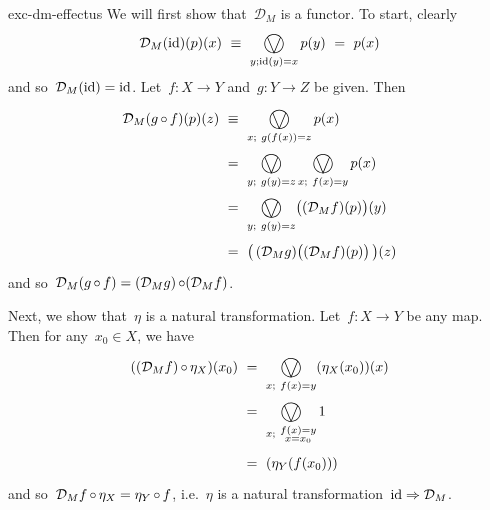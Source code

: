 \begin{solution}{exc-dm-effectus}%
We will first show that~$\mathcal{D}_M$ is a functor.
To start, clearly
\begin{equation*}
    \mathcal{D}_M(\id)(p)(x) 
        \ \equiv\  \bigovee_{y; \id(y)=x} p(y)
        \ =\ p(x)
\end{equation*}
        and so~$\mathcal{D}_M(\mathrm{id}) = \mathrm{id}$.
Let~$f\colon X \to Y$ and~$g\colon Y \to Z$ be given.
    Then
    \begin{align*}
        \mathcal{D}_M (g \after f) (p) (z)
        & \ \equiv\ \bigovee_{x;\ g(f(x))=z} p(x)\\
        & \ =\ \bigovee_{y;\ g(y) = z}
               \bigovee_{x;\ f(x) = y} p(x) \\
        & \ =\ \bigovee_{y;\ g(y) = z}
                \bigl((\mathcal{D}_M f)(p)\bigr)(y) \\
        & \ =\ \bigl( \, (\mathcal{D}_M g) \bigl(
                (\mathcal{D}_M f)(p)\bigr) \, \bigr)(z)
    \end{align*}
    and so~$\mathcal{D}_M (g \mathop{\circ} f)
        = (\mathcal{D}_M g)\mathop{\circ} (\mathcal{D}_M f)$.

Next, we show that~$\eta$ is a natural transformation.
Let~$f\colon X \to Y$ be any map.
Then for any~$x_0 \in X$, we have
\begin{align*}
    ((\mathcal{D}_M f) \after \eta_X) (x_0)
        & \ = \ \bigovee_{x;\ f(x)=y} (\eta_X(x_0))(x) \\
        & \ = \ \bigovee_{x;\  \substack{f(x)=y \\ x = x_0}} 1 \\
        & \ = \ (\eta_Y (f(x_0)))
\end{align*}
and so~$\mathcal{D}_M f \mathop{\circ} \eta_X = \eta_Y \mathop{\circ} f$,
    i.e.~$\eta$ is a natural transformation~$\mathrm{id} \Rightarrow \mathcal{D}_M$.


\end{solution}
